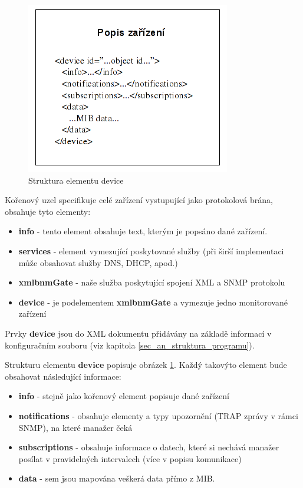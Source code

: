 \begin{figure}[htp]
	\begin{center}
		\includegraphics{obrazky/04_schema_device.png}
		\caption{Struktura elementu device}
		\label{obr_an_device_struktura}
	\end{center}
\end{figure}

Kořenový uzel specifikuje celé zařízení vystupující jako protokolová brána, obsahuje tyto elementy:
\begin{itemize}
	\item \textbf{info} - tento element obsahuje text, kterým je popsáno dané zařízení.
	\item \textbf{services} - element vymezující poskytované služby (při širší implementaci může obsahovat služby DNS, DHCP, apod.)
	\item \textbf{xmlbnmGate} - naše služba poskytující spojení XML a SNMP protokolu
	\item \textbf{device} - je podelementem \textbf{xmlbnmGate} a vymezuje jedno monitorované zařízení
\end{itemize}

Prvky \textbf{device} jsou do XML dokumentu přidávány na základě informací v konfiguračním souboru (viz kapitola \ref{sec_an_struktura_programu}).

Strukturu elementu \textbf{device} popisuje obrázek \ref{obr_an_device_struktura}. Každý takovýto element bude obsahovat následující informace:
\begin{itemize}
	\item \textbf{info} - stejně jako kořenový element popisuje dané zařízení
	\item \textbf{notifications} - obsahuje elementy a typy upozornění (TRAP zprávy v rámci SNMP), na které manažer čeká
	\item \textbf{subscriptions} - obsahuje informace o datech, které si nechává manažer posílat v pravidelných intervalech (více v popisu komunikace)
	\item \textbf{data} - sem jsou mapována veškerá data přímo z MIB.
\end{itemize}

